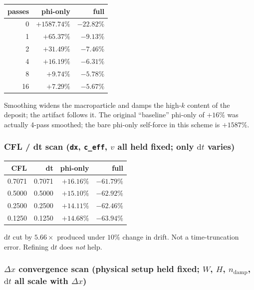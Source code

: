 \documentclass[11pt,a4paper]{article}
\newcommand{\dd}{\mathrm{d}}
\begin{document}
\begin{center}
\begin{tabular}{rrr}
\toprule
passes & phi-only      & full          \\
\midrule
0      & $+1587.74\%$  & $-22.82\%$    \\
1      & $+65.37\%$    & $-9.13\%$     \\
2      & $+31.49\%$    & $-7.46\%$     \\
4      & $+16.19\%$    & $-6.31\%$     \\
8      & $+9.74\%$     & $-5.78\%$     \\
16     & $+7.29\%$     & $-5.67\%$     \\
\bottomrule
\end{tabular}
\end{center}

Smoothing widens the macroparticle and damps the high-$k$ content of
the deposit; the artifact follows it.  The original ``baseline''
phi-only of $+16\%$ was actually 4-pass smoothed; the bare phi-only
self-force in this scheme is $+1587\%$.

\subsubsection*{CFL / dt scan (\texttt{dx}, \texttt{c\_eff}, $v$ all held fixed; only $\dd t$ varies)}

\begin{center}
\begin{tabular}{rrrr}
\toprule
CFL    & dt     & phi-only & full    \\
\midrule
0.7071 & 0.7071 & $+16.16\%$  & $-61.79\%$ \\
0.5000 & 0.5000 & $+15.10\%$  & $-62.92\%$ \\
0.2500 & 0.2500 & $+14.11\%$  & $-62.46\%$ \\
0.1250 & 0.1250 & $+14.68\%$  & $-63.94\%$ \\
\bottomrule
\end{tabular}
\end{center}

$\dd t$ cut by $5.66\times$ produced under $10\%$ change in drift.
Not a time-truncation error.  Refining $\dd t$ does \emph{not} help.

\subsubsection*{$\Delta x$ convergence scan (physical setup held fixed; $W$, $H$, $n_{\mathrm{damp}}$, $\dd t$ all scale with $\Delta x$)}
\end{document}
